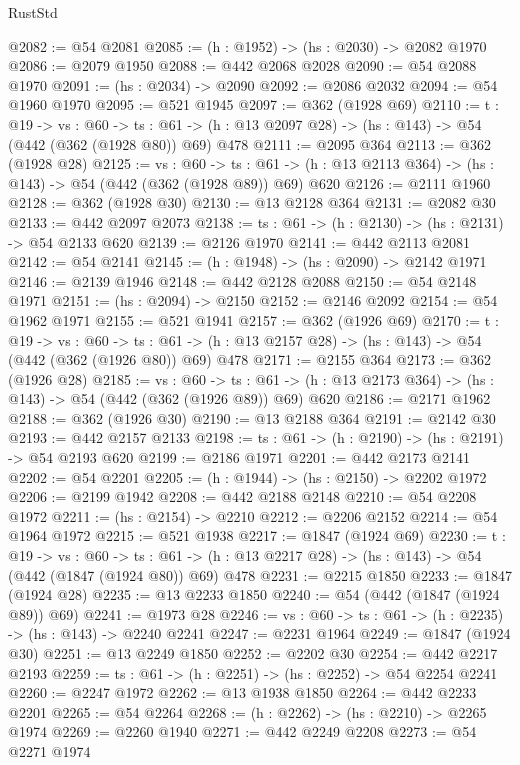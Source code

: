 \begin{lexlean}{RustStd}
\begin{coremodule}
@2082 := @54 @2081
@2085 := (h : @1952) -> (hs : @2030) -> @2082 @1970
@2086 := @2079 @1950
@2088 := @442 @2068 @2028
@2090 := @54 @2088 @1970
@2091 := (hs : @2034) -> @2090
@2092 := @2086 @2032
@2094 := @54 @1960 @1970
@2095 := @521 @1945
@2097 := @362 (@1928 @69)
@2110 := {t : @19} ->
  {vs : @60} ->
  {ts : @61} -> (h : @13 @2097 @28) -> (hs : @143) -> @54 (@442 (@362 (@1928 @80)) @69) @478
@2111 := @2095 @364
@2113 := @362 (@1928 @28)
@2125 := {vs : @60} ->
  {ts : @61} -> (h : @13 @2113 @364) -> (hs : @143) -> @54 (@442 (@362 (@1928 @89)) @69) @620
@2126 := @2111 @1960
@2128 := @362 (@1928 @30)
@2130 := @13 @2128 @364
@2131 := @2082 @30
@2133 := @442 @2097 @2073
@2138 := {ts : @61} -> (h : @2130) -> (hs : @2131) -> @54 @2133 @620
@2139 := @2126 @1970
@2141 := @442 @2113 @2081
@2142 := @54 @2141
@2145 := (h : @1948) -> (hs : @2090) -> @2142 @1971
@2146 := @2139 @1946
@2148 := @442 @2128 @2088
@2150 := @54 @2148 @1971
@2151 := (hs : @2094) -> @2150
@2152 := @2146 @2092
@2154 := @54 @1962 @1971
@2155 := @521 @1941
@2157 := @362 (@1926 @69)
@2170 := {t : @19} ->
  {vs : @60} ->
  {ts : @61} -> (h : @13 @2157 @28) -> (hs : @143) -> @54 (@442 (@362 (@1926 @80)) @69) @478
@2171 := @2155 @364
@2173 := @362 (@1926 @28)
@2185 := {vs : @60} ->
  {ts : @61} -> (h : @13 @2173 @364) -> (hs : @143) -> @54 (@442 (@362 (@1926 @89)) @69) @620
@2186 := @2171 @1962
@2188 := @362 (@1926 @30)
@2190 := @13 @2188 @364
@2191 := @2142 @30
@2193 := @442 @2157 @2133
@2198 := {ts : @61} -> (h : @2190) -> (hs : @2191) -> @54 @2193 @620
@2199 := @2186 @1971
@2201 := @442 @2173 @2141
@2202 := @54 @2201
@2205 := (h : @1944) -> (hs : @2150) -> @2202 @1972
@2206 := @2199 @1942
@2208 := @442 @2188 @2148
@2210 := @54 @2208 @1972
@2211 := (hs : @2154) -> @2210
@2212 := @2206 @2152
@2214 := @54 @1964 @1972
@2215 := @521 @1938
@2217 := @1847 (@1924 @69)
@2230 := {t : @19} ->
  {vs : @60} ->
  {ts : @61} -> (h : @13 @2217 @28) -> (hs : @143) -> @54 (@442 (@1847 (@1924 @80)) @69) @478
@2231 := @2215 @1850
@2233 := @1847 (@1924 @28)
@2235 := @13 @2233 @1850
@2240 := @54 (@442 (@1847 (@1924 @89)) @69)
@2241 := @1973 @28
@2246 := {vs : @60} -> {ts : @61} -> (h : @2235) -> (hs : @143) -> @2240 @2241
@2247 := @2231 @1964
@2249 := @1847 (@1924 @30)
@2251 := @13 @2249 @1850
@2252 := @2202 @30
@2254 := @442 @2217 @2193
@2259 := {ts : @61} -> (h : @2251) -> (hs : @2252) -> @54 @2254 @2241
@2260 := @2247 @1972
@2262 := @13 @1938 @1850
@2264 := @442 @2233 @2201
@2265 := @54 @2264
@2268 := (h : @2262) -> (hs : @2210) -> @2265 @1974
@2269 := @2260 @1940
@2271 := @442 @2249 @2208
@2273 := @54 @2271 @1974

\end{coremodule}
\end{lexlean}

